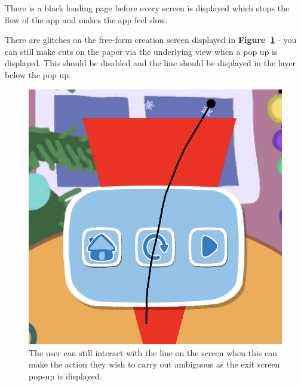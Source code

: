 \documentclass[11pt]{article}
\begin{document}
                There is a black loading page before every screen is displayed which stops the flow of the app and makes the app feel slow.
                
                There are glitches on the free-form creation screen displayed in \textbf{Figure~\ref{fig:peppaGlitchLine}} - you can still make cuts on the paper via the underlying view when a pop up is displayed. This should be disabled and the line should be displayed in the layer below the pop up.
                

                
                \begin{figure}[!ht]
                        \begin{minipage}{0.32\textwidth}
                            \centering \includegraphics[width=0.8\linewidth]{Images/peppa/peppaGlitchLine.PNG}
                            \caption{The user can still interact with the line on the screen when this can make the action they wish to carry out ambiguous as the exit screen pop-up is displayed.}
                            \label{fig:peppaGlitchLine}
                        \end{minipage}
                        \begin{minipage}{0.32\textwidth}
                            \centering

\end{minipage}
\end{figure}
\end{document}
